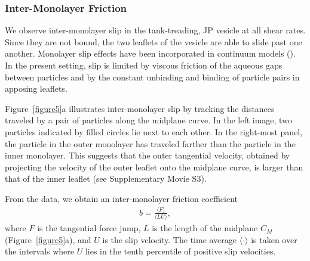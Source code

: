 \documentclass[lineno]{jfm}
\begin{document}
\subsubsection{Inter-Monolayer Friction}
We observe inter-monolayer slip in the tank-treading, JP vesicle at all
shear rates. Since they are not bound, the two leaflets of the vesicle
are able to slide past one another. 
Monolayer slip effects have been incorporated in continuum models (\cite{sch-vla-mik2010}).
In the present setting, slip is limited by viscous
friction of the aqueous gaps between particles and by the constant
unbinding and binding of particle pairs in apposing leaflets. 


Figure~\ref{figure5}a illustrates inter-monolayer slip by tracking the distances
traveled by a pair of particles along the midplane curve. In the left image,
two particles indicated by filled circles lie next to each other. In the right-most panel, the
particle in the outer monolayer has traveled farther than the
particle in the inner monolayer. This suggests that
the outer tangential velocity, obtained by projecting the velocity of the
outer leaflet onto the midplane curve, 
is larger than that of the inner leaflet 
(see Supplementary Movie S3).

From the data, we obtain an inter-monolayer friction coefficient 
\begin{align}
  b =  \frac{\langle F \rangle}{\langle L   U \rangle} ,
\end{align}
where $F$ is the tangential force jump, $L$ is the length of the
midplane $C_M$ (Figure~\ref{figure5}a), and $U$ is the slip velocity.
The time average $\langle \cdot \rangle$ is taken over the intervals where $U$ lies in the 
tenth percentile of positive slip velocities.


\end{document}
